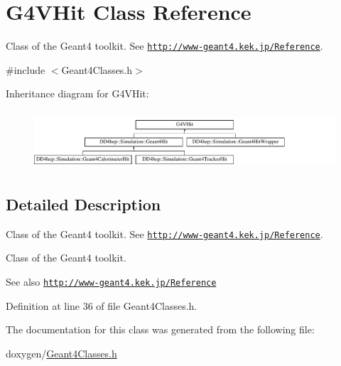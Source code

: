 \hypertarget{class_g4_v_hit}{}\section{G4\+V\+Hit Class Reference}
\label{class_g4_v_hit}


Class of the Geant4 toolkit. See \href{http://www-geant4.kek.jp/Reference}{\tt http\+://www-\/geant4.\+kek.\+jp/\+Reference}.  




{\ttfamily \#include $<$Geant4\+Classes.\+h$>$}

Inheritance diagram for G4\+V\+Hit\+:\begin{figure}[H]
\begin{center}
\leavevmode
\includegraphics[height=2.196079cm]{class_g4_v_hit}
\end{center}
\end{figure}


\subsection{Detailed Description}
Class of the Geant4 toolkit. See \href{http://www-geant4.kek.jp/Reference}{\tt http\+://www-\/geant4.\+kek.\+jp/\+Reference}. 

Class of the Geant4 toolkit. \begin{DoxySeeAlso}{See also}
\href{http://www-geant4.kek.jp/Reference}{\tt http\+://www-\/geant4.\+kek.\+jp/\+Reference} 
\end{DoxySeeAlso}


Definition at line 36 of file Geant4\+Classes.\+h.



The documentation for this class was generated from the following file\+:\begin{DoxyCompactItemize}
\item 
doxygen/\hyperlink{_geant4_classes_8h}{Geant4\+Classes.\+h}\end{DoxyCompactItemize}
